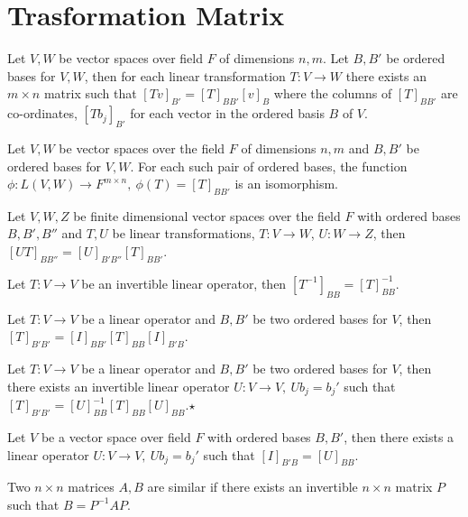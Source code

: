 \section{Trasformation Matrix}
	\begin{theorem}
		Let $V,W$ be vector spaces over field $F$ of dimensions $n,m$. Let $B,B'$ be ordered bases for $V,W$, then for each linear transformation $T : V \to W$ there exists an $m \times n$ matrix such that $[Tv]_{B'} = [T]_{BB'}[v]_B$ where the columns of $[T]_{BB'}$ are co-ordinates, $[Tb_j]_{B'}$ for each vector in the ordered basis $B$ of $V$.
	\end{theorem}
	\begin{theorem}
		Let $V,W$ be vector spaces over the field $F$ of dimensions $n,m$ and $B,B'$ be ordered bases for $V,W$. For each such pair of ordered bases, the function $\phi : L(V,W) \to F^{m \times n},\ \phi(T) = [T]_{BB'}$ is an isomorphism.
	\end{theorem}
	\begin{theorem}
		Let $V,W,Z$ be finite dimensional vector spaces over the field $F$ with ordered bases $B,B',B''$ and $T,U$ be linear transformations, $T: V \to W$, $U: W \to Z$, then $[UT]_{BB''} = [U]_{B'B''}[T]_{BB'}$.
	\end{theorem}
	\begin{corollary}
		Let $T : V \to V$ be an invertible linear operator, then $[T^{-1}]_{BB} = [T]_{BB}^{-1}$.
	\end{corollary}
	\begin{corollary}
		Let $T : V \to V$ be a linear operator and $B,B'$ be two ordered bases for $V$, then $[T]_{B'B'} = [I]_{BB'}[T]_{BB}[I]_{B'B}$.
	\end{corollary}
	\begin{theorem}
		Let $T : V \to V$ be a linear operator and $B,B'$ be two ordered bases for $V$, then there exists an invertible linear operator $U : V \to V,\ Ub_j = b_j'$ such that $[T]_{B'B'} = [U]_{BB}^{-1}[T]_{BB}[U]_{BB}$.$\star$
	\end{theorem}
	\begin{remark}
		Let $V$ be a vector space over field $F$ with ordered bases $B,B'$, then there exists a linear operator $U : V \to V,\ Ub_j = b_j'$ such that $[I]_{B'B} = [U]_{BB}$.
	\end{remark}
	\begin{definition}
		Two $n \times n$ matrices $A,B$ are similar if there exists an invertible $n \times n$ matrix $P$ such that $B = P^{-1}AP$.
	\end{definition}
